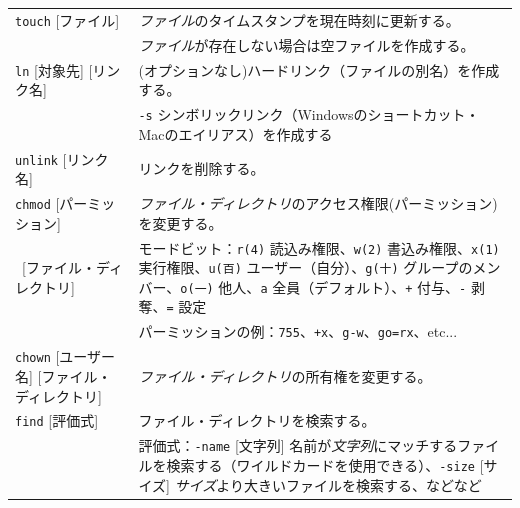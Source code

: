 \documentclass[a4j]{ltjreport}
\begin{document}
\begin{longtable}[c]{|p{3.5cm}|p{13.5cm}|}
        \texttt{touch} [ファイル]&\emph{ファイル}のタイムスタンプを現在時刻に更新する。\\
        &\emph{ファイル}が存在しない場合は空ファイルを作成する。\\
        \hline

        \texttt{ln} [対象先] [リンク名] &(オプションなし)ハードリンク（ファイルの別名）を作成する。\\
        &\texttt{-s} シンボリックリンク（Windowsのショートカット・Macのエイリアス）を作成する\\
        \hline
        \texttt{unlink} [リンク名] &リンクを削除する。\\
        \hline

        \texttt{chmod} [パーミッション] &\emph{ファイル・ディレクトリ}のアクセス権限(パーミッション)を変更する。\\
        \ [ファイル・ディレクトリ] &モードビット：\texttt{r(4)} 読込み権限、\texttt{w(2)} 書込み権限、\texttt{x(1)} 実行権限、\texttt{u(百)} ユーザー（自分）、\texttt{g(十)} グループのメンバー、\texttt{o(一)} 他人、\texttt{a} 全員（デフォルト）、\texttt{+} 付与、\texttt{-} 剥奪、\texttt{=} 設定\\
        &パーミッションの例：\texttt{755}、\texttt{+x}、\texttt{g-w}、\texttt{go=rx}、etc...\\
        \hline
        \texttt{chown} [ユーザー名] [ファイル・ディレクトリ]&\emph{ファイル・ディレクトリ}の所有権を変更する。\\
        \hline

        \texttt{find} [評価式] &ファイル・ディレクトリを検索する。\\
        &評価式：\texttt{-name} [文字列] 名前が\emph{文字列}にマッチするファイルを検索する（ワイルドカードを使用できる）、\texttt{-size} [サイズ] \emph{サイズ}より大きいファイルを検索する、などなど\\  
        \hline 


\end{longtable}
\end{document}
